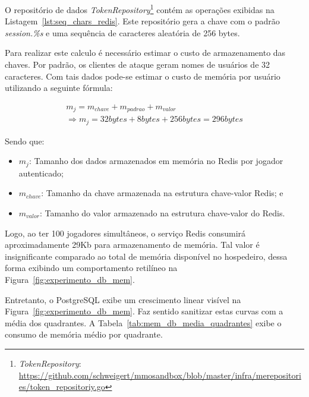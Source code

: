 O repositório de dados \textit{TokenRepository}\footnote{\textit{TokenRepository}: \url{https://github.com/schweigert/mmosandbox/blob/master/infra/merepositories/token_repositoriy.go}} contém as operações exibidas na Listagem~\ref{lst:seq_chars_redis}.
%
Este repositório gera a chave com o padrão \textit{session.\%s} e uma sequência de caracteres aleatória de 256 bytes.

Para realizar este calculo é necessário estimar o custo de armazenamento das chaves.
%
Por padrão, os clientes de ataque geram nomes de usuários de 32 caracteres.
%
Com tais dados pode-se estimar o custo de memória por usuário utilizando a seguinte fórmula:

\begin{multline}
m_j = m_{chave} + m_{padrao} + m_{valor} \\
\Rightarrow m_j = 32bytes + 8bytes + 256bytes = 296bytes
\end{multline}

Sendo que:

\begin{itemize}
\item $m_j$: Tamanho dos dados armazenados em memória no Redis por jogador autenticado;
\item $m_{chave}$: Tamanho da chave armazenada na estrutura chave-valor Redis; e
\item $m_{valor}$: Tamanho do valor armazenado na estrutura chave-valor do Redis.
\end{itemize}


Logo, ao ter 100 jogadores simultâneos, o serviço Redis consumirá aproximadamente 29Kb para armazenamento de memória.
%
Tal valor é insignificante comparado ao total de memória disponível no hospedeiro, dessa forma exibindo um comportamento retilíneo na Figura~\ref{fig:experimento_db_mem}.

Entretanto, o PostgreSQL exibe um crescimento linear visível na Figura~\ref{fig:experimento_db_mem}.
%
Faz sentido sanitizar estas curvas com a média dos quadrantes.
%
A Tabela~\ref{tab:mem_db_media_quadrantes} exibe o consumo de memória médio por quadrante.

